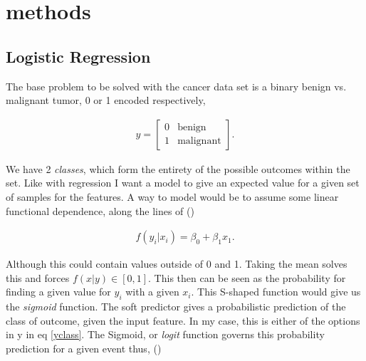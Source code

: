 \documentclass[10pt]{article}
\begin{document}

\section{methods}


\subsection{Logistic Regression}
The base problem to be solved with the cancer data set is a binary benign vs.
malignant tumor, 0 or 1 encoded respectively, 

\begin{align}
y = 
	\begin{bmatrix}
		0 & \text{benign} \\
		1 & \text{malignant}
	\end{bmatrix}.
	\label{yclass}
\end{align}

We have 2 \emph{classes}, which form the entirety of the possible outcomes within
the set. Like with regression I want a model to give an expected value for a given 
set of samples for the features. A way to model would be to assume some linear functional
dependence, along the lines of (\cite{MortenLectureNotes2020})

\begin{align*}
	f(y_i|x_i) = \beta_0 + \beta_1 x_1.
\end{align*}

Although this could contain values outside of 0 and 1. Taking the mean solves
this and forces $f(x|y) \in [0, 1]$. This then can be seen as the probability
for finding a given value for $y_i$ with a given $x_i$. This S-shaped function
would give us the \emph{sigmoid} function. 	
The soft predictor gives a probabilistic prediction of the class of outcome,
given the input feature. In my case, this is either of the options in
y in eq \ref{yclass}.  The Sigmoid, or \emph{logit} function governs this
probability prediction for a given event thus, (\cite{MortenLectureNotes2020})
\end{document}
